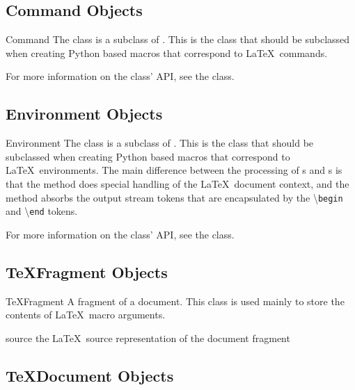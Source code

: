 \documentclass{manual}
\newcommand{\macro}[1]{\textbackslash\texttt{#1}}
\begin{document}
\subsection{Command Objects}

\begin{classdesc}{Command}{}
The  class is a subclass of .  This is the class
that should be subclassed when creating Python based macros that correspond
to \LaTeX\ commands.

For more information on the  class' API, see the 
 class.
\end{classdesc}


\subsection{Environment Objects}

\begin{classdesc}{Environment}{}
The  class is a subclass of .  This is the
class that should be subclassed when creating Python based macros that 
correspond to \LaTeX\ environments.  The main difference between the 
processing of s and s is that the
 method does special handling of the \LaTeX\ document
context, and the  method absorbs the output stream tokens
that are encapsulated by the \macro{begin} and \macro{end} tokens. 

For more information on the  class' API, see the 
 class.
\end{classdesc}


\subsection{TeXFragment Objects}

\begin{classdesc}{TeXFragment}{}
A fragment of a document.  This class is used mainly to store the contents
of \LaTeX\ macro arguments.
\end{classdesc}

\begin{memberdesc}[TeXFragment]{source}
the \LaTeX\ source representation of the document fragment
\end{memberdesc}


\subsection{TeXDocument Objects}
\end{document}
